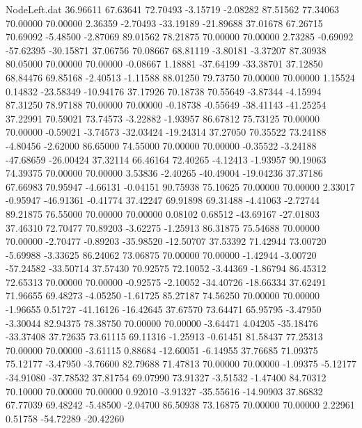 \begin{filecontents}{NodeLeft.dat}
  36.96611   67.63641   72.70493    -3.15719   -2.08282   87.51562   77.34063   70.00000   70.00000    2.36359   -2.70493  -33.19189  -21.89688
  37.01678   67.26715   70.69092    -5.48500   -2.87069   89.01562   78.21875   70.00000   70.00000    2.73285   -0.69092  -57.62395  -30.15871
  37.06756   70.08667   68.81119    -3.80181   -3.37207   87.30938   80.05000   70.00000   70.00000   -0.08667    1.18881  -37.64199  -33.38701
  37.12850   68.84476   69.85168    -2.40513   -1.11588   88.01250   79.73750   70.00000   70.00000    1.15524    0.14832  -23.58349  -10.94176
  37.17926   70.18738   70.55649    -3.87344   -4.15994   87.31250   78.97188   70.00000   70.00000   -0.18738   -0.55649  -38.41143  -41.25254
  37.22991   70.59021   73.74573    -3.22882   -1.93957   86.67812   75.73125   70.00000   70.00000   -0.59021   -3.74573  -32.03424  -19.24314
  37.27050   70.35522   73.24188    -4.80456   -2.62000   86.65000   74.55000   70.00000   70.00000   -0.35522   -3.24188  -47.68659  -26.00424
  37.32114   66.46164   72.40265    -4.12413   -1.93957   90.19063   74.39375   70.00000   70.00000    3.53836   -2.40265  -40.49004  -19.04236
  37.37186   67.66983   70.95947    -4.66131   -0.04151   90.75938   75.10625   70.00000   70.00000    2.33017   -0.95947  -46.91361   -0.41774
  37.42247   69.91898   69.31488    -4.41063   -2.72744   89.21875   76.55000   70.00000   70.00000    0.08102    0.68512  -43.69167  -27.01803
  37.46310   72.70477   70.89203    -3.62275   -1.25913   86.31875   75.54688   70.00000   70.00000   -2.70477   -0.89203  -35.98520  -12.50707
  37.53392   71.42944   73.00720    -5.69988   -3.33625   86.24062   73.06875   70.00000   70.00000   -1.42944   -3.00720  -57.24582  -33.50714
  37.57430   70.92575   72.10052    -3.44369   -1.86794   86.45312   72.65313   70.00000   70.00000   -0.92575   -2.10052  -34.40726  -18.66334
  37.62491   71.96655   69.48273    -4.05250   -1.61725   85.27187   74.56250   70.00000   70.00000   -1.96655    0.51727  -41.16126  -16.42645
  37.67570   73.64471   65.95795    -3.47950   -3.30044   82.94375   78.38750   70.00000   70.00000   -3.64471    4.04205  -35.18476  -33.37408
  37.72635   73.61115   69.11316    -1.25913   -0.61451   81.58437   77.25313   70.00000   70.00000   -3.61115    0.88684  -12.60051   -6.14955
  37.76685   71.09375   75.12177    -3.47950   -3.76600   82.79688   71.47813   70.00000   70.00000   -1.09375   -5.12177  -34.91080  -37.78532
  37.81754   69.07990   73.91327    -3.51532   -1.47400   84.70312   70.10000   70.00000   70.00000    0.92010   -3.91327  -35.55616  -14.90903
  37.86832   67.77039   69.48242    -5.48500   -2.04700   86.50938   73.16875   70.00000   70.00000    2.22961    0.51758  -54.72289  -20.42260

\end{filecontents}
